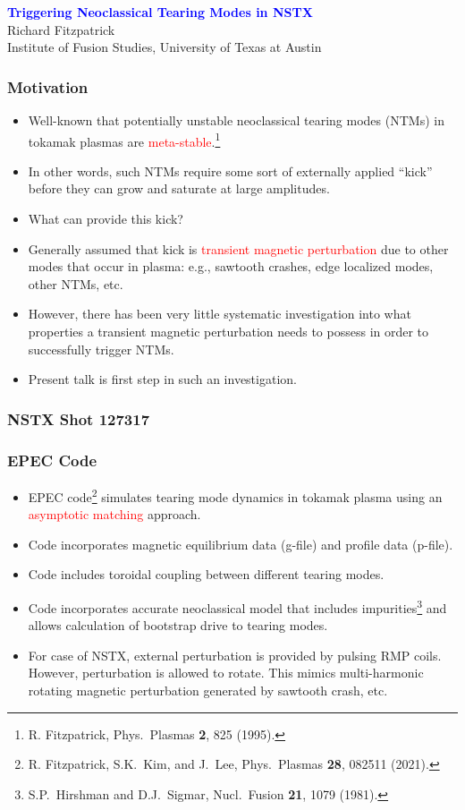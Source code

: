 \documentclass{beamer}
\newcommand{\blue}[1]{\textcolor{blue}{#1}}
\newcommand{\red}[1]{\textcolor{red}{#1}}
\begin{document}
\begin{frame}
\begin{center}
\blue{\Large\bf Triggering Neoclassical Tearing Modes in NSTX}\\[2ex]
Richard Fitzpatrick\\[0.5ex]
Institute of Fusion Studies, University of Texas at Austin
\end{center}


\end{frame}

\begin{frame}
\frametitle{Motivation}
 
\begin{itemize}
\item Well-known that potentially unstable neoclassical tearing modes (NTMs) in tokamak plasmas are \red{meta-stable}.\footnote{R. Fitzpatrick, 
Phys.\ Plasmas {\bf 2}, 825 (1995).}
\item In other words, such NTMs require some sort of externally applied ``kick'' before they can grow and saturate at large amplitudes.
\item What can provide this kick? 
\item Generally assumed that kick is \red{transient magnetic perturbation} due to other modes that occur in plasma: e.g., sawtooth crashes, edge localized modes, other NTMs, etc.
\item However, there has been very little systematic investigation into what properties a transient magnetic
perturbation needs to possess in order to successfully trigger NTMs. 
\item Present talk is first step in such an investigation. 
\end{itemize}
\end{frame}

\begin{frame}
\frametitle{NSTX Shot 127317}
\frametitle{EPEC Code}
 
\begin{itemize}
\item EPEC code\footnote{R. Fitzpatrick, S.K.~Kim, and J.~Lee, Phys.\ Plasmas {\bf 28}, 082511 (2021).} simulates tearing mode dynamics in tokamak plasma using an \red{asymptotic matching} approach. 
\item Code incorporates magnetic equilibrium data (g-file) and profile data (p-file). 
\item Code includes toroidal coupling between different tearing modes. 
\item Code incorporates accurate neoclassical model that includes impurities\footnote{S.P.~Hirshman and D.J.~Sigmar, Nucl.\ Fusion {\bf 21}, 1079 (1981).} and allows calculation of bootstrap
drive to tearing modes. 
\item For case of NSTX, external perturbation is provided by pulsing RMP coils. However, perturbation is allowed to rotate.
This mimics multi-harmonic rotating magnetic perturbation generated by sawtooth crash, etc.
\end{itemize}
\end{frame}
\end{document}
